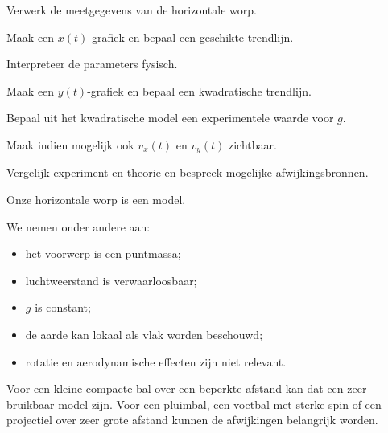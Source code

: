 \documentclass{ximera}
\begin{document}
\begin{oefening}[Laboanalyse]{\oefU\ESS}

Verwerk de meetgegevens van de horizontale worp.

\begin{question}
Maak een $x(t)$-grafiek en bepaal een geschikte trendlijn.
\end{question}

\begin{question}
Interpreteer de parameters fysisch.
\end{question}

\begin{question}
Maak een $y(t)$-grafiek en bepaal een kwadratische trendlijn.
\end{question}

\begin{question}
Bepaal uit het kwadratische model een experimentele waarde voor $g$.
\end{question}

\begin{question}
Maak indien mogelijk ook $v_x(t)$ en $v_y(t)$ zichtbaar.
\end{question}

\begin{question}
Vergelijk experiment en theorie en bespreek mogelijke
afwijkingsbronnen.
\end{question}

\end{oefening}




Onze horizontale worp is een model.

We nemen onder andere aan:

\begin{itemize}
  \item het voorwerp is een puntmassa;
  \item luchtweerstand is verwaarloosbaar;
  \item $g$ is constant;
  \item de aarde kan lokaal als vlak worden beschouwd;
  \item rotatie en aerodynamische effecten zijn niet relevant.
\end{itemize}

Voor een kleine compacte bal over een beperkte afstand kan dat een
zeer bruikbaar model zijn. Voor een pluimbal, een voetbal met sterke
spin of een projectiel over zeer grote afstand kunnen de afwijkingen
belangrijk worden.
\end{document}
